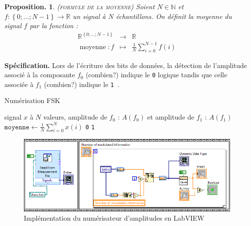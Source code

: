 \documentclass[twocolumn,pre,floats,aps,amsmath,amssymb]{revtex4}
\newtheorem{proposition}[theorem]{Proposition.}
\newenvironment{remark}[1][Remarque.]{\begin{trivlist}
\item[\hskip \labelsep {\bfseries #1}]}{\end{trivlist}}
\begin{document}
\begin{proposition}
  \textsc{(formule de la moyenne)}
  Soient $N \in \mathbb{N}$ et $f : \left \{ 0 ; \dots ; N - 1 \right \} \rightarrow \mathbb{R}$ un signal \`a $N$ \'echantillons. On d\'efinit la moyenne du signal $f$ par la fonction :
  \begin{eqnarray*}
    \mathbb{R}^{\left \{ 0 ; \dots ; N - 1 \right \}} &\rightarrow& \mathbb{R}\\
    \operatorname{moyenne} : f &\mapsto& \frac{1}{N}\sum^{N - 1}_{i = 0}{f(i)}
  \end{eqnarray*}
\end{proposition}

\noindent
\textbf{Sp\'ecification.}
  Lors de l'\'ecriture des bits de donn\'ees, la d\'etection de l'amplitude associ\'e \`a la composante $f_0$ (combien?) indique le \texttt{0} logique tandis que celle associ\'ee \`a $f_1$ (combien?) indique le \texttt{1}~\cite{Comment1}.

\begin{algorithm}[h]
\caption{Num\'erisation FSK}
\label{algo_numerisation_FSK}
\begin{algorithmic}[1]
  \REQUIRE signal $x$ \`a $N$ valeurs, amplitude de $f_0$ : $A(f_0)$ et amplitude de $f_1$ : $A(f_1)$
  \STATE $\texttt{moyenne} \leftarrow \frac{1}{N}\sum^N_{i = 0}{x(i)}$
  \RETURN \texttt{0}
  \ELSE
  \RETURN \texttt{1}
  \ENDIF
\end{algorithmic}
\end{algorithm}


\begin{figure}[]
  \includegraphics[width=15cm]{pictures/numerisation_amplitude.png}
\caption{Impl\'ementation du num\'erisateur d'amplitudes en LabVIEW}
\label{fig:algo_numerisation_FSK_labview}
\end{figure}

\end{document}
